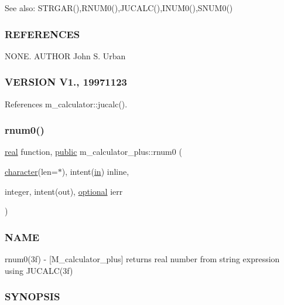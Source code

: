 See also\+: S\+T\+R\+G\+A\+R(),R\+N\+U\+M0(),J\+U\+C\+A\+L\+C(),I\+N\+U\+M0(),S\+N\+U\+M0() \subsubsection*{R\+E\+F\+E\+R\+E\+N\+C\+ES}

N\+O\+NE. A\+U\+T\+H\+OR John S. Urban \subsubsection*{V\+E\+R\+S\+I\+ON V1., 19971123}

References m\+\_\+calculator\+::jucalc().

\mbox{\label{namespacem__calculator__plus_a448c42e7171e27c1f4a8e339687b0e3f}} 
\subsubsection{\texorpdfstring{rnum0()}{rnum0()}}
{\footnotesize\ttfamily \hyperlink{read__watch_83_8txt_abdb62bde002f38ef75f810d3a905a823}{real} function, \hyperlink{M__stopwatch_83_8txt_a2f74811300c361e53b430611a7d1769f}{public} m\+\_\+calculator\+\_\+plus\+::rnum0 (\begin{DoxyParamCaption}\item[{\hyperlink{option__stopwatch_83_8txt_abd4b21fbbd175834027b5224bfe97e66}{character}(len=$\ast$), intent(\hyperlink{M__journal_83_8txt_afce72651d1eed785a2132bee863b2f38}{in})}]{inline,  }\item[{integer, intent(out), \hyperlink{option__stopwatch_83_8txt_aa4ece75e7acf58a4843f70fe18c3ade5}{optional}}]{ierr }\end{DoxyParamCaption})}



\subsubsection*{N\+A\+ME}

rnum0(3f) -\/ \mbox{[}M\+\_\+calculator\+\_\+plus\mbox{]} returns real number from string expression using J\+U\+C\+A\+L\+C(3f) \subsubsection*{S\+Y\+N\+O\+P\+S\+IS}

